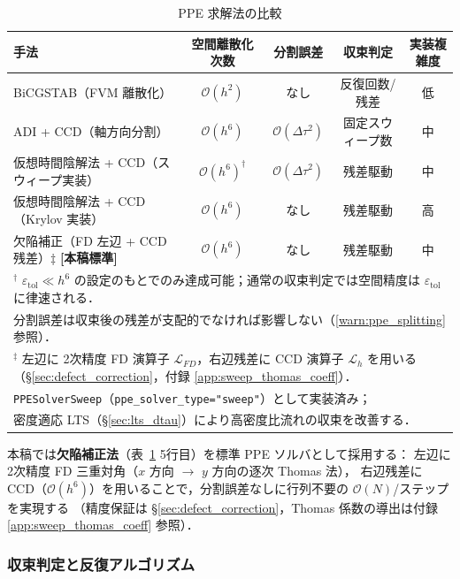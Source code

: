 \begin{table}[ht]
\centering
\small
\caption{PPE 求解法の比較}
\label{tab:ppe_methods}
\begin{tabular}{lcccc}
\hline
手法 & 空間離散化次数 & 分割誤差 & 収束判定 & 実装複雑度 \\
\hline
BiCGSTAB（FVM 離散化） & $\mathcal{O}(h^2)$ & なし & 反復回数/残差 & 低 \\
ADI + CCD（軸方向分割） & $\mathcal{O}(h^6)$ & $\mathcal{O}(\Delta\tau^2)$ & 固定スウィープ数 & 中 \\
仮想時間陰解法 + CCD（スウィープ実装）& $\mathcal{O}(h^6)^{\dagger}$ & $\mathcal{O}(\Delta\tau^2)$ & 残差駆動 & 中 \\
仮想時間陰解法 + CCD（Krylov 実装） & $\mathcal{O}(h^6)$ & なし & 残差駆動 & 高 \\
欠陥補正（FD 左辺 + CCD 残差）$\ddagger$ \textbf{[本稿標準]} & $\mathcal{O}(h^6)$ & なし & 残差駆動 & 中 \\
\hline
\multicolumn{5}{l}{$^{\dagger}$ $\varepsilon_\mathrm{tol} \ll h^6$ の設定のもとでのみ達成可能；通常の収束判定では空間精度は $\varepsilon_\mathrm{tol}$ に律速される．}\\
\multicolumn{5}{l}{\phantom{$^{\dagger}$} 分割誤差は収束後の残差が支配的でなければ影響しない（\ref{warn:ppe_splitting} 参照）．}\\
\multicolumn{5}{l}{$^{\ddagger}$ 左辺に 2次精度 FD 演算子 $\mathcal{L}_{FD}$，右辺残差に CCD 演算子 $\mathcal{L}_h$ を用いる（§\ref{sec:defect_correction}，付録 \ref{app:sweep_thomas_coeff}）．}\\
\multicolumn{5}{l}{\phantom{$^{\ddagger}$} \texttt{PPESolverSweep}（\texttt{ppe\_solver\_type="sweep"}）として実装済み；}\\
\multicolumn{5}{l}{\phantom{$^{\ddagger}$} 密度適応 LTS（§\ref{sec:lts_dtau}）により高密度比流れの収束を改善する．}
\end{tabular}
\end{table}

本稿では\textbf{欠陥補正法}（表~\ref{tab:ppe_methods} 5行目）を標準 PPE ソルバとして採用する：
左辺に 2次精度 FD 三重対角（$x$ 方向 $\to$ $y$ 方向の逐次 Thomas 法），
右辺残差に CCD（$\mathcal{O}(h^6)$）を用いることで，分割誤差なしに行列不要の $\mathcal{O}(N)$/ステップを実現する
（精度保証は §\ref{sec:defect_correction}，Thomas 係数の導出は付録 \ref{app:sweep_thomas_coeff} 参照）．

\subsubsection{収束判定と反復アルゴリズム}
\label{sec:pseudo_convergence}

